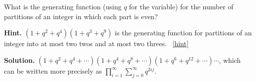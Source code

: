 \documentclass{book}
\begin{document}
\setcounter{project}{321}
\addtocounter{project}{-1}
\begin{activity}[]\label{activity-314}
\hypertarget{p-1611}{}%
What is the generating function (using \(q\) for the variable) for the number of partitions of an integer in which each part is even?%
\par\smallskip%
\noindent\textbf{Hint.}\hypertarget{hint-212}{}\quad%
\hypertarget{p-1612}{}%
\((1 + q^2 + q^4 )(1 + q^3 + q^9 )\) is the generating function for partitions of an integer into at most two twos and at most two threes.%
~\hfill{\tiny\hyperlink{a-321}{[hint]}\hypertarget{q-321}{}}\par\smallskip%
\noindent\textbf{Solution.}\hypertarget{solution-219}{}\quad%
\hypertarget{p-1613}{}%
\((1+q^2+q^4+\cdots)(1+q^4+q^8+\cdots)(1+q^6+q^{12}+\cdots)\cdots\), which can be written more precisely as \(\displaystyle\prod_{i=1}^\infty
\sum_{j=0}^\infty q^{2ij}\).%
\end{activity}

\clearpage
\end{document}

